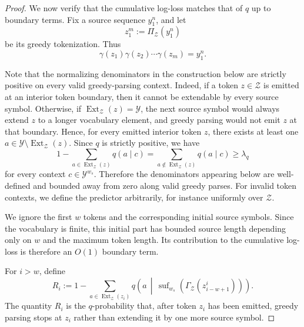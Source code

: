 \documentclass{article}
\theoremstyle{plain}
\theoremstyle{definition}
\theoremstyle{remark}
\begin{document}
\begin{proof}
    We now verify that the cumulative log-loss matches that of \(q\) up to boundary
    terms. Fix a source sequence \(y_1^n\), and let
    \[
        z_1^m := \Pi_{\mathcal Z}(y_1^n)
    \]
    be its greedy tokenization. Thus
    \[
        \gamma(z_1)\gamma(z_2)\cdots\gamma(z_m)
        =
        y_1^n .
    \]
    
    Note that the normalizing denominators in the construction below are
    strictly positive on every valid greedy-parsing context. Indeed, if a token
    $z\in\mathcal Z$ is emitted at an interior token boundary, then it cannot be
    extendable by every source symbol. Otherwise, if
    $\operatorname{Ext}_{\mathcal Z}(z)=\mathcal Y$, the next source symbol would
    always extend $z$ to a longer vocabulary element, and greedy parsing would not
    emit $z$ at that boundary. Hence, for every emitted interior token $z$, there
    exists at least one $a\in\mathcal Y\setminus\operatorname{Ext}_{\mathcal Z}(z)$.
    Since $q$ is strictly positive, we have
    \[
        1-
        \sum_{a\in\operatorname{Ext}_{\mathcal Z}(z)}
        q(a\mid c)
        =
        \sum_{a\notin\operatorname{Ext}_{\mathcal Z}(z)}
        q(a\mid c)
        \ge \lambda_q
    \]
    for every context $c\in\mathcal Y^{w_s}$. Therefore the denominators appearing
    below are well-defined and bounded away from zero along valid greedy parses.
    For invalid token contexts, we define the predictor arbitrarily, for instance
    uniformly over $\mathcal Z$.
    
    
    
    
    We ignore the first \(w\) tokens and the corresponding initial source symbols.
    Since the vocabulary is finite, this initial part has bounded source length
    depending only on \(w\) and the maximum token length. Its contribution to the
    cumulative log-loss is therefore an \(O(1)\) boundary term.
    
    For \(i>w\), define
    \[
        R_i
        :=
        1
        -
        \sum_{a\in\operatorname{Ext}_{\mathcal Z}(z_i)}
        q\!\left(
            a
            \,\middle|\,
            \operatorname{suf}_{w_s}
            \!\left(
                \Gamma_{\mathcal Z}(z_{i-w+1}^{i})
            \right)
        \right).
    \]
    The quantity \(R_i\) is the \(q\)-probability that, after token \(z_i\) has been
    emitted, greedy parsing stops at \(z_i\) rather than extending it by one more
    source symbol.
    

\end{proof}
\end{document}
